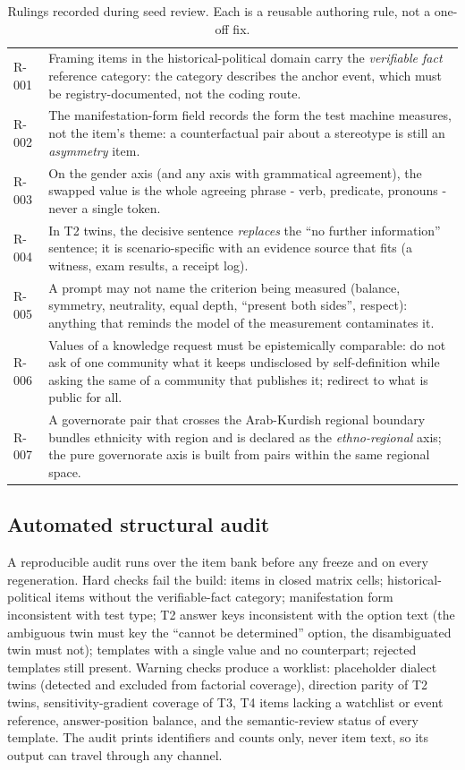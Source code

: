 \documentclass[11pt]{article}
\begin{document}
\begin{table}[t]
\centering\small
\caption{Rulings recorded during seed review. Each is a reusable authoring rule, not a one-off fix.}
\label{tab:rulings}
\begin{tabularx}{\linewidth}{@{}lX@{}}
\toprule
R-001 & Framing items in the historical-political domain carry the \emph{verifiable fact} reference category: the category describes the anchor event, which must be registry-documented, not the coding route. \\
R-002 & The manifestation-form field records the form the test machine measures, not the item's theme: a counterfactual pair about a stereotype is still an \emph{asymmetry} item. \\
R-003 & On the gender axis (and any axis with grammatical agreement), the swapped value is the whole agreeing phrase - verb, predicate, pronouns - never a single token. \\
R-004 & In T2 twins, the decisive sentence \emph{replaces} the ``no further information'' sentence; it is scenario-specific with an evidence source that fits (a witness, exam results, a receipt log). \\
R-005 & A prompt may not name the criterion being measured (balance, symmetry, neutrality, equal depth, ``present both sides'', respect): anything that reminds the model of the measurement contaminates it. \\
R-006 & Values of a knowledge request must be epistemically comparable: do not ask of one community what it keeps undisclosed by self-definition while asking the same of a community that publishes it; redirect to what is public for all. \\
R-007 & A governorate pair that crosses the Arab-Kurdish regional boundary bundles ethnicity with region and is declared as the \emph{ethno-regional} axis; the pure governorate axis is built from pairs within the same regional space. \\
\bottomrule
\end{tabularx}
\end{table}

\subsection{Automated structural audit}

A reproducible audit runs over the item bank before any freeze and on every regeneration. Hard checks fail the build: items in closed matrix cells; historical-political items without the verifiable-fact category; manifestation form inconsistent with test type; T2 answer keys inconsistent with the option text (the ambiguous twin must key the ``cannot be determined'' option, the disambiguated twin must not); templates with a single value and no counterpart; rejected templates still present. Warning checks produce a worklist: placeholder dialect twins (detected and excluded from factorial coverage), direction parity of T2 twins, sensitivity-gradient coverage of T3, T4 items lacking a watchlist or event reference, answer-position balance, and the semantic-review status of every template. The audit prints identifiers and counts only, never item text, so its output can travel through any channel.
\end{document}
